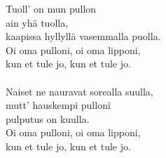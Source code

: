 
        Tuoll' on mun pullon \\
        ain yhä tuolla, \\
        kaapissa hyllyllä vasemmalla puolla. \\
        Oi oma pulloni, oi oma lipponi, \\
        kun et tule jo, kun et tule jo. \\
\hspace{10mm} \\
        Naiset ne nauravat sorealla suulla, \\
        mutt' hauskempi pulloni \\
        pulputus on kuulla. \\
        Oi oma pulloni, oi oma lipponi, \\
        kun et tule jo, kun et tule jo. \\
